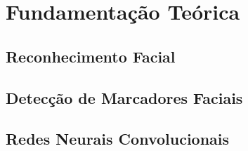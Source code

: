 \chapter{Fundamentação Teórica}

\section{Reconhecimento Facial}
\label{sec:facialrecog}

\section{Detecção de Marcadores Faciais}
\label{sec:faciallm}

\section{Redes Neurais Convolucionais}
\label{sec:3dcnn}